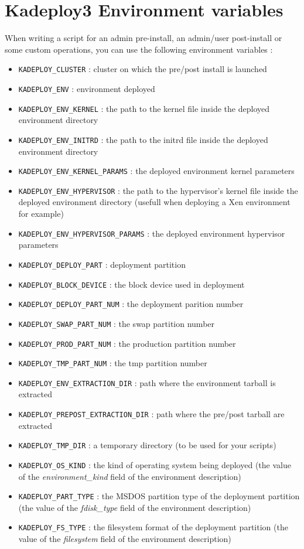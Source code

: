 \documentclass[a4wide,10pt,oneside]{book}
\begin{document}
\section{Kadeploy3 Environment variables}\label{sec:env_vars}
When writing a script for an admin pre-install, an admin/user post-install or some custom operations, you can use the following environment variables :
\begin{itemize}
\item \texttt{KADEPLOY\_CLUSTER} : cluster on which the pre/post install is launched
\item \texttt{KADEPLOY\_ENV} : environment deployed
\item \texttt{KADEPLOY\_ENV\_KERNEL} : the path to the kernel file inside the deployed environment directory
\item \texttt{KADEPLOY\_ENV\_INITRD} : the path to the initrd file inside the deployed environment directory
\item \texttt{KADEPLOY\_ENV\_KERNEL\_PARAMS} : the deployed environment kernel parameters
\item \texttt{KADEPLOY\_ENV\_HYPERVISOR} : the path to the hypervisor's kernel file inside the deployed environment directory (usefull when deploying a Xen environment for example)
\item \texttt{KADEPLOY\_ENV\_HYPERVISOR\_PARAMS} : the deployed environment hypervisor parameters
\item \texttt{KADEPLOY\_DEPLOY\_PART} : deployment partition
\item \texttt{KADEPLOY\_BLOCK\_DEVICE} : the block device used in deployment
\item \texttt{KADEPLOY\_DEPLOY\_PART\_NUM} : the deployment parition number
\item \texttt{KADEPLOY\_SWAP\_PART\_NUM} : the swap partition number
\item \texttt{KADEPLOY\_PROD\_PART\_NUM} : the production partition number
\item \texttt{KADEPLOY\_TMP\_PART\_NUM} : the tmp partition number
\item \texttt{KADEPLOY\_ENV\_EXTRACTION\_DIR} : path where the environment tarball is extracted
\item \texttt{KADEPLOY\_PREPOST\_EXTRACTION\_DIR} : path where the pre/post tarball are extracted
\item \texttt{KADEPLOY\_TMP\_DIR} : a temporary directory (to be used for your scripts)
\item \texttt{KADEPLOY\_OS\_KIND} : the kind of operating system being deployed (the value of the \emph{environment\_kind} field of the environment description)
\item \texttt{KADEPLOY\_PART\_TYPE} : the MSDOS partition type of the deployment partition (the value of the \emph{fdisk\_type} field of the environment description)
\item \texttt{KADEPLOY\_FS\_TYPE} : the filesystem format of the deployment partition (the value of the \emph{filesystem} field of the environment description)
\end{itemize}
\end{document}
